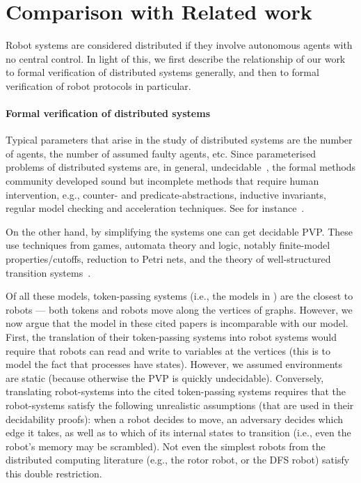 \documentclass{aamas2015}
\begin{document}



\section{Comparison with Related work} \label{sec:related}

Robot systems are considered distributed if they involve autonomous agents with no central control. In light of this, we first describe the relationship of our work to formal verification of distributed systems generally, and then to formal verification of robot protocols in particular.

\paragraph{Formal verification of distributed systems}
Typical parameters that arise in the study of distributed systems are the number of agents, the number of assumed faulty agents, etc. Since parameterised problems of distributed systems are, in general, undecidable~\cite{AK86, Suzuki}, the formal methods community developed sound but incomplete methods that require human intervention, e.g., counter- and predicate-abstractions, inductive invariants, regular model checking and acceleration techniques. See for instance~\cite[references on pages 2-3]{PXZ02}.

On the other hand, by simplifying the systems one can get decidable PVP. These use techniques from games, automata theory and logic, notably finite-model properties/cutoffs, reduction to Petri nets, and the theory of well-structured transition systems~\cite{EN95,EsparzaFM99,EmersonK03LICS,CTTV04,KoLo13AAMAS,Delz14,AJKR14,AKRSV14}. 

Of all these models, token-passing systems (i.e., the models in \cite{EN95,CTTV04,AJKR14,AKRSV14}) are the closest to robots --- both tokens and robots move along the vertices of graphs. However, we now argue that the model in these cited papers is incomparable with our model. First, the translation of their token-passing systems into robot systems would require that robots can read and write to variables at the vertices (this is to model the fact that processes have states). However, we assumed environments are static (because otherwise the PVP is quickly undecidable). Conversely, translating robot-systems into the cited token-passing systems requires that the robot-systems satisfy the following unrealistic assumptions (that are used in their decidability proofs): when a robot decides to move, an adversary decides which edge it takes, as well as to which of its internal states to transition (i.e., even the robot's memory may be scrambled). Not even the simplest robots from the distributed computing literature (e.g., the rotor robot, or the DFS robot)  satisfy this double restriction.
\end{document}

